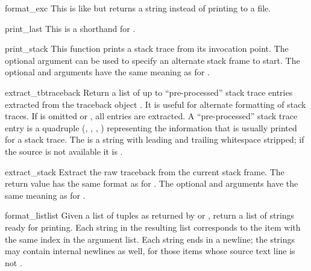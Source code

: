 \begin{funcdesc}{format_exc}{}
This is like  but returns a string
instead of printing to a file.
\end{funcdesc}

\begin{funcdesc}{print_last}{}
This is a shorthand for .
\end{funcdesc}

\begin{funcdesc}{print_stack}{}
This function prints a stack trace from its invocation point.  The
optional  argument can be used to specify an alternate stack
frame to start.  The optional  and  arguments have the
same meaning as for .
\end{funcdesc}

\begin{funcdesc}{extract_tb}{traceback}
Return a list of up to  ``pre-processed'' stack trace
entries extracted from the traceback object .  It is
useful for alternate formatting of stack traces.  If  is
omitted or , all entries are extracted.  A
``pre-processed'' stack trace entry is a quadruple (,
, , ) representing
the information that is usually printed for a stack trace.  The
 is a string with leading and trailing whitespace
stripped; if the source is not available it is .
\end{funcdesc}

\begin{funcdesc}{extract_stack}{}
Extract the raw traceback from the current stack frame.  The return
value has the same format as for .  The
optional  and  arguments have the same meaning as
for .
\end{funcdesc}

\begin{funcdesc}{format_list}{list}
Given a list of tuples as returned by  or
, return a list of strings ready for
printing.  Each string in the resulting list corresponds to the item
with the same index in the argument list.  Each string ends in a
newline; the strings may contain internal newlines as well, for those
items whose source text line is not .
\end{funcdesc}

